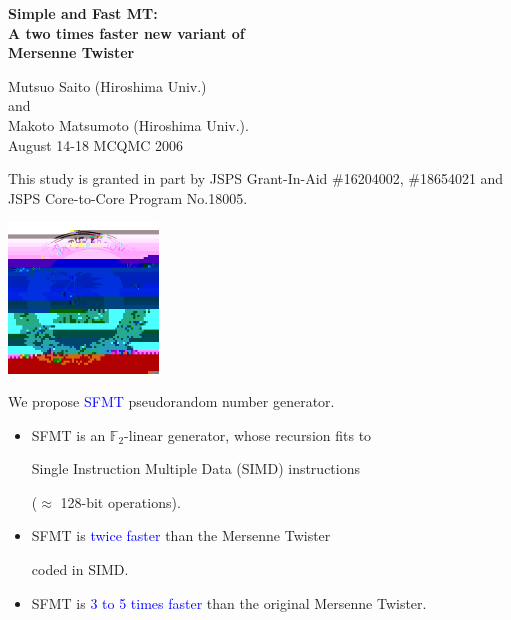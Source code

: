 \documentclass[a4j,12pt,landscape]{jarticle}
\title{}
\author{}
\date{\today}
\def\F2{{\mathbb F}_2}
\begin{document}
\Huge

\begin{center}
{\bf Simple and Fast MT:\\
  A two times faster new variant of \\
  Mersenne Twister}
\vspace{1cm}

Mutsuo Saito (Hiroshima Univ.) \\
and \\
Makoto Matsumoto (Hiroshima Univ.).\\
August 14-18 MCQMC 2006
\end{center}
\vspace{\fill}
\parbox{19cm}{\Large
This study is granted in part by
JSPS Grant-In-Aid \#16204002, \#18654021
and JSPS Core-to-Core Program No.18005.
}
\parbox{2cm}{\vskip 1cm \includegraphics*[width=4cm,height=4cm]{logo.jpg}}

\newpage
We propose \textcolor{blue}{SFMT} pseudorandom number generator.

\begin{itemize}
\item 
SFMT is an $\F2$-linear generator,
whose recursion fits to 

Single Instruction Multiple Data (SIMD)
instructions 

($\approx$ 128-bit operations).

\item
SFMT is \textcolor{blue}{twice faster} than the Mersenne Twister

coded in SIMD.

\item
SFMT is \textcolor{blue}{3 to 5 times faster} than the original Mersenne Twister.

\end{itemize}

\end{document}
